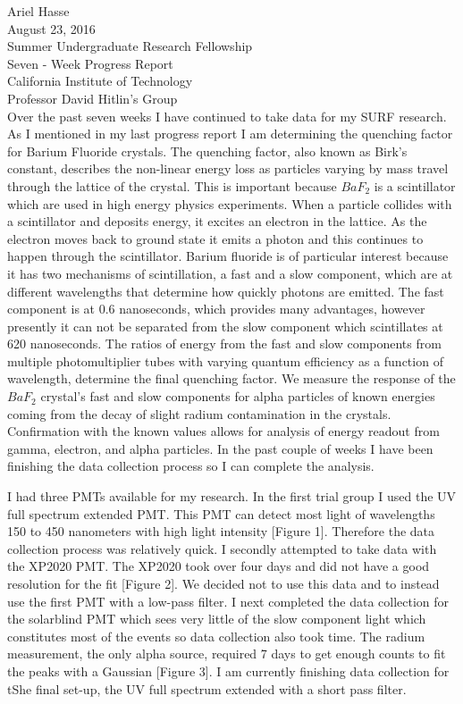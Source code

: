 \documentclass{article}
\begin{document}
\noindent 
Ariel Hasse\\
August 23, 2016\\
Summer Undergraduate Research Fellowship\\
Seven - Week Progress Report\\
California Institute of Technology\\
Professor David Hitlin’s Group\\


Over the past seven weeks I have continued to take data for my SURF research. As I mentioned in my last progress report I am determining the quenching factor for Barium Fluoride crystals. The quenching factor, also known as Birk's constant, describes the non-linear energy loss as particles varying by mass travel through the lattice of the crystal. This is important because $BaF_2$ is a scintillator which are used in high energy physics experiments. When a particle collides with a scintillator and deposits energy, it excites an electron in the lattice. As the electron moves back to ground state it emits a photon and this continues to happen through the scintillator. Barium fluoride is of particular interest because it has two mechanisms of scintillation, a fast and a slow component, which are at different wavelengths that determine how quickly photons are emitted. The fast component is at 0.6 nanoseconds, which provides many advantages, however presently it can not be separated from the slow component which scintillates at 620 nanoseconds. The ratios of energy from the fast and slow components from multiple photomultiplier tubes with varying quantum efficiency as a function of wavelength, determine the final quenching factor. We measure the response of the $BaF_2$ crystal's fast and slow components for alpha particles of known energies coming from the decay of slight radium contamination in the crystals. Confirmation with the known values allows for analysis of energy readout from gamma, electron, and alpha particles. In the past couple of weeks I have been finishing the data collection process so I can complete the analysis. 

I had three PMTs available for my research. In the first trial group I used the UV full spectrum extended PMT. This PMT can detect most light of wavelengths 150 to 450 nanometers with high light intensity [Figure 1]. Therefore the data collection process was relatively quick. I secondly attempted to take data with the XP2020 PMT. The XP2020 took over four days and did not have a good resolution for the fit [Figure 2]. We decided not to use this data and to instead use the first PMT with a low-pass filter. I next completed the data collection for the solarblind PMT which sees very little of the slow component light which constitutes most of the events so data collection also took time. The radium measurement, the only alpha source, required 7 days to get enough counts to fit the peaks with a Gaussian [Figure 3]. I am currently finishing data collection for tShe final set-up, the UV full spectrum extended with a short pass filter.
\end{document}
